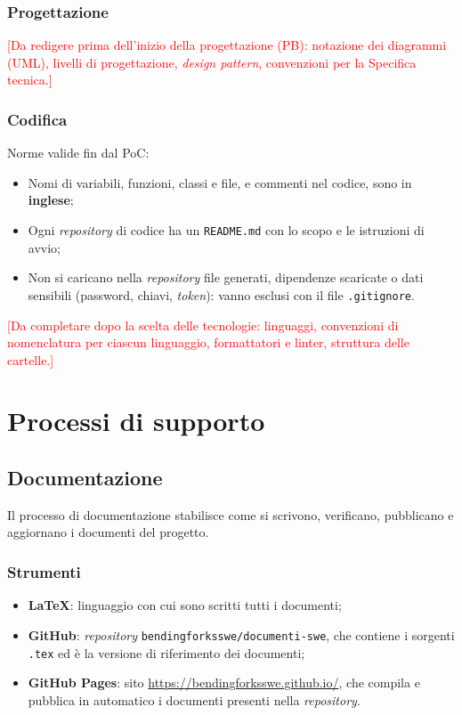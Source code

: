 \documentclass[12pt,a4paper]{article}
\newcommand{\ph}[1]{\textcolor{red}{[#1]}}
\newcommand{\tightlist}{\setlength{\itemsep}{1pt}\setlength{\parskip}{0pt}}
\begin{document}
\subsubsection{Progettazione}
\ph{Da redigere prima dell'inizio della progettazione (PB): notazione dei diagrammi (UML), livelli di progettazione, \emph{design pattern}, convenzioni per la Specifica tecnica.}

\subsubsection{Codifica}\label{sec:codifica}
Norme valide fin dal PoC:
\begin{itemize}
\tightlist
\item Nomi di variabili, funzioni, classi e file, e commenti nel codice, sono in \textbf{inglese};
\item Ogni \emph{repository} di codice ha un \texttt{README.md} con lo scopo e le istruzioni di avvio;
\item Non si caricano nella \emph{repository} file generati, dipendenze scaricate o dati sensibili (password, chiavi, \emph{token}): vanno esclusi con il file \texttt{.gitignore}.
\end{itemize}
\ph{Da completare dopo la scelta delle tecnologie: linguaggi, convenzioni di nomenclatura per ciascun linguaggio, formattatori e linter, struttura delle cartelle.}

\section{Processi di supporto}\label{sec:supporto}

\subsection{Documentazione}
Il processo di documentazione stabilisce come si scrivono, verificano, pubblicano e aggiornano i documenti del progetto.

\subsubsection{Strumenti}
\begin{itemize}
\tightlist
\item \textbf{\LaTeX}: linguaggio con cui sono scritti tutti i documenti;
\item \textbf{GitHub}: \emph{repository} \texttt{bendingforksswe/documenti-swe}, che contiene i sorgenti \texttt{.tex} ed è la versione di riferimento dei documenti;
\item \textbf{GitHub Pages}: sito \url{https://bendingforksswe.github.io/}, che compila e pubblica in automatico i documenti presenti nella \emph{repository}.
\end{itemize}
\end{document}
